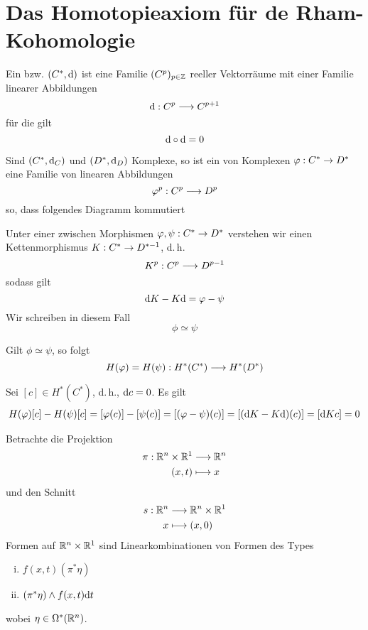 \newpage
\section{Das Homotopieaxiom für de Rham-Kohomologie}
\Def{}
Ein  bzw.  $(C^*,\text{d})$ ist eine Familie $(C^p)_{p\in \mathbb{Z}}$ reeller Vektorräume mit einer Familie linearer Abbildungen
\[ \text{d} : C^p \overset{}{\longrightarrow} C^{p+1} \]
für die gilt
\[ \text{d} \circ \text{d} = 0 \]

\Def{}
Sind $(C^*,\text{d}_C)$ und $(D^*, \text{d}_D)$ Komplexe, so ist ein  von Komplexen $\varphi : C^* \overset{}{\rightarrow} D^*$ eine Familie von linearen Abbildungen
\[ \varphi^p : C^p \overset{}{\longrightarrow} D^p \]
so, dass folgendes Diagramm kommutiert
\begin{center}
\end{center}

\Def{}
Unter einer  zwischen Morphismen $\varphi, \psi : C^* \overset{}{\rightarrow} D^*$ verstehen wir einen Kettenmorphismus $K : C^* \overset{}{\rightarrow} D^{*-1}$, d.\,h.
\[ K^p : C^p \overset{}{\longrightarrow} D^{p-1} \]
sodass gilt
\[ \text{d} K - K \text{d} = \varphi - \psi \]
Wir schreiben in diesem Fall
\[ \phi \simeq \psi \]

\Lem{}
Gilt $\phi \simeq \psi$, so folgt
\[ H(\varphi) = H(\psi) : H^*(C^*) \overset{}{\longrightarrow} H^*(D^*) \]
\begin{Beweis}{}
Sei $[c] \in H^*(C^*)$, d.\,h., $\text{d} c = 0$. Es gilt
\begin{align*}
H(\varphi)[c] - H(\psi)[c] 
= [\varphi(c)] - [\psi(c)]
= [(\varphi - \psi)(c)]
= [(\text{d} K - K \text{d})(c)]
= [\text{d} K c ]
= 0
\end{align*}
\end{Beweis}

\Bem{}
Betrachte die Projektion
\begin{align*}
\pi : \mathbb{R}^n \times \mathbb{R}^1 & \overset{}{\longrightarrow} \mathbb{R}^n\\
(x,t) & \longmapsto x
\end{align*}
und den Schnitt
\begin{align*}
s : \mathbb{R}^n & \overset{}{\longrightarrow} \mathbb{R}^n \times \mathbb{R}^1\\
x & \longmapsto (x,0)
\end{align*}
Formen auf $\mathbb{R}^n \times \mathbb{R}^1$ sind Linearkombinationen von Formen des Types
\begin{enumerate}[(i)]
	\item $f(x,t)(\pi^*\eta)  $ 
	\item $(\pi^*\eta) \wedge f(x,t) \text{d} t$
\end{enumerate}
wobei $\eta \in \Omega^*(\mathbb{R}^n)$.

